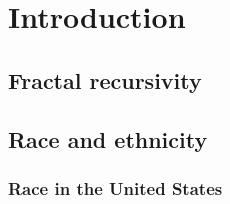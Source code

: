 \chapter{Introduction}
  \section{Fractal recursivity}
  \section{Race and ethnicity}
    \subsection{Race in the United States}
